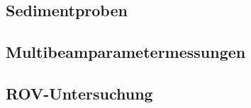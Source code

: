 \documentclass[12pt,titlepage]{scrreprt}
\begin{document}
\subsection{Sedimentproben}

\subsection{Multibeamparametermessungen}

\subsection{ROV-Untersuchung}








\end{document}
